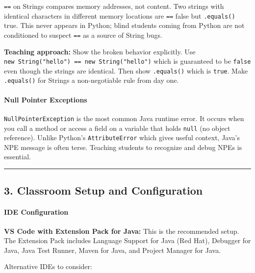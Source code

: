 \documentclass[
  justified,
  openright,
]{tufte-book}
\let\subsubsection\paragraph
\let\paragraph\paragraph
\let\subsubsection\paragraph
\let\paragraph\paragraph
\begin{document}
\texttt{==} on Strings compares memory addresses, not content. Two
strings with identical characters in different memory locations are
\texttt{==} false but \texttt{.equals()} true. This never appears in
Python; blind students coming from Python are not conditioned to suspect
\texttt{==} as a source of String bugs.

\textbf{Teaching approach:} Show the broken behavior explicitly. Use
\texttt{new\ String("hello")\ ==\ new\ String("hello")} which is
guaranteed to be \texttt{false} even though the strings are identical.
Then show \texttt{.equals()} which is \texttt{true}. Make
\texttt{.equals()} for Strings a non-negotiable rule from day one.

\subsubsection{Null Pointer Exceptions}\label{null-pointer-exceptions}

\texttt{NullPointerException} is the most common Java runtime error. It
occurs when you call a method or access a field on a variable that holds
\texttt{null} (no object reference). Unlike Python's
\texttt{AttributeError} which gives useful context, Java's NPE message
is often terse. Teaching students to recognize and debug NPEs is
essential.

\begin{center}\rule{0.5\linewidth}{0.5pt}\end{center}

\subsection{3. Classroom Setup and
Configuration}\label{classroom-setup-and-configuration}

\subsubsection{IDE Configuration}\label{ide-configuration}

\textbf{VS Code with Extension Pack for Java:} This is the recommended
setup. The Extension Pack includes Language Support for Java (Red Hat),
Debugger for Java, Java Test Runner, Maven for Java, and Project Manager
for Java.

Alternative IDEs to consider:
\end{document}
